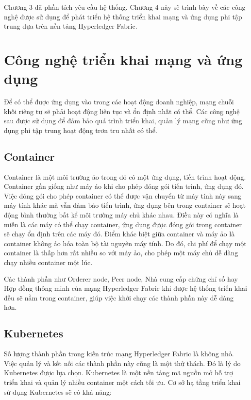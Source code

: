 \documentclass[../DoAn.tex]{subfiles}
\begin{document}
Chương 3 đã phần tích yêu cầu hệ thống. Chương 4 này sẽ trình bày về các công
nghệ được sử dụng để phát triển hệ thống triển khai mạng và ứng dụng
phi tập trung dựa trên nền tảng Hyperledger Fabric.

\section{Công nghệ triển khai mạng và ứng dụng}

Để có thể được ứng dụng vào trong các hoạt động doanh nghiệp, mạng chuỗi khối riêng tư sẽ phải hoạt động liên tục và ổn định nhất có thể. Các công nghệ sau được sử dụng để đảm bảo quá trình triển khai, quản lý mạng cũng như ứng dụng phi tập trung hoạt động trơn tru nhất có thể.

\subsection{Container}
Container là một môi trường ảo trong đó có một ứng dụng, tiến trình hoạt động.
Container gần giống như máy áo khi cho phép đóng gói tiến trình, ứng dụng đó.
Việc đóng gói cho phép container có thể được vận chuyển từ máy tính này sang
máy tính khác mà vẫn đảm bảo tiến trình, ứng dụng bên trong container sẽ hoạt
động bình thường bất kể môi trường máy chủ khác nhau. Điều này có nghĩa là miễn
là các máy có thể chạy container, ứng dụng được đóng gói trong container sẽ
chạy ổn định trên các máy đó. Điểm khác biệt giữa container và máy ảo là
container không ảo hóa toàn bộ tài nguyên máy tính. Do đó, chi phí để chạy một
container là thấp hơn rất nhiều so với máy ảo, cho phép một máy chủ dễ dàng
chạy nhiều container một lúc.

Các thành phần như Orderer node, Peer node, Nhà cung cấp chứng chỉ số hay Hợp
đồng thông minh của mạng Hyperledger Fabric khi được hệ thống triển khai đều sẽ
nằm trong container, giúp việc khởi chạy các thành phần này dễ dàng hơn.

\subsection{Kubernetes}
Số lượng thành phần trong kiến trúc mạng Hyperledger Fabric là không nhỏ. Việc
quản lý và kết nối các thành phần này cũng là một thử thách. Đó là lý do
Kubernetes\cite{kubernetes} được lựa chọn. Kubernetes là một nền tảng mã nguồn mở hỗ trợ triển
khai và quản lý nhiều container một cách tối ưu. Cơ sở hạ tầng triển khai sử
dụng Kubernetes sẽ có khả năng:
\end{document}
